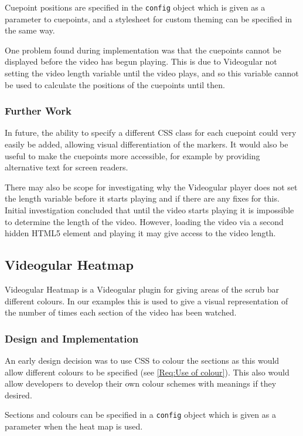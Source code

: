 Cuepoint positions are specified in the \texttt{config} object which is given as a parameter to cuepoints, and a stylesheet for custom theming can be specified in the same way.

One problem found during implementation was that the cuepoints cannot be displayed before the video has begun playing. This is due to \gls{Videogular} not setting the video length variable until the video plays, and so this variable cannot be used to calculate the positions of the cuepoints until then.

\subsubsection{Further Work}
In future, the ability to specify a different \gls{CSS} class for each cuepoint could very easily be added, allowing visual differentiation of the markers. It would also be useful to make the cuepoints more accessible, for example by providing alternative text for screen readers.

There may also be scope for investigating why the \gls{Videogular} player does not set the length variable before it starts playing and if there are any fixes for this. Initial investigation concluded that until the video starts playing it is impossible to determine the length of the video. However, loading the video via a second hidden \gls{HTML5} element and playing it may give access to the video length.

\subsection{Videogular Heatmap}
\gls{Videogular} Heatmap is a \gls{Videogular} plugin for giving areas of the scrub bar different colours. In our examples this is used to give a visual representation of the number of times each section of the video has been watched.

\subsubsection{Design and Implementation}
An early design decision was to use \gls{CSS} to colour the sections as this would allow different colours to be specified (see \cref{Req:Use of colour}). This also would allow developers to develop their own colour schemes with meanings if they desired.

Sections and colours can be specified in a \texttt{config} object which is given as a parameter when the heat map is used.

